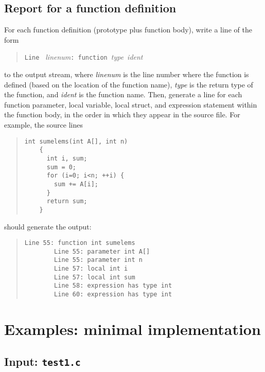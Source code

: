 \documentclass{article}
\begin{document}
\subsection{Report for a function definition}
\label{SEC:funcout}

For each function definition (prototype plus function body),
write a line of the form
\begin{quote}
  {\tt Line } \emph{linenum}{\tt :}~{\tt function}~\emph{type}~\emph{ident}
\end{quote}
to the output stream,
where \emph{linenum} is the line number where the function is defined
(based on the location of the function name),
\emph{type} is the return type of the function,
and \emph{ident} is the function name.
Then, generate a line for each function parameter,
local variable, local struct,
and expression statement
within the function body,
in the order in which they appear in the source file.
For example, the source lines
\begin{quote}
  \begin{lstlisting}[firstnumber=55]
    int sumelems(int A[], int n)
    {
      int i, sum;
      sum = 0;
      for (i=0; i<n; ++i) {
        sum += A[i];
      }
      return sum;
    }
  \end{lstlisting}
\end{quote}
should generate the output:
\begin{quote}
  \begin{lstlisting}[style=Output]
    Line 55: function int sumelems
        Line 55: parameter int A[]
        Line 55: parameter int n
        Line 57: local int i
        Line 57: local int sum
        Line 58: expression has type int
        Line 60: expression has type int
  \end{lstlisting}
\end{quote}


\section{Examples: minimal implementation} \label{SEC:exmin}

\subsection{Input: {\tt test1.c}}


\end{document}
